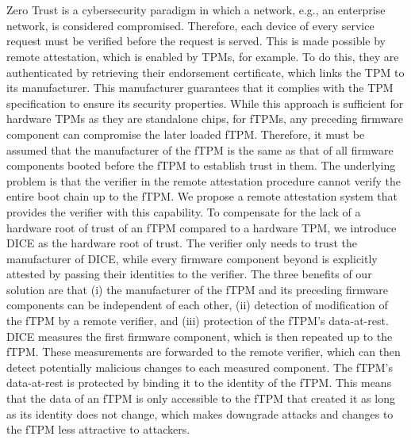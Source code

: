 \chapter{\abstractname}

Zero Trust is a cybersecurity paradigm in which a network, e.g., an enterprise network, is considered compromised.
Therefore, each device of every service request must be verified before the request is served.
This is made possible by remote attestation, which is enabled by \acp{TPM}, for example.
To do this, they are authenticated by retrieving their endorsement certificate, which links the \ac{TPM} to its manufacturer.
This manufacturer guarantees that it complies with the \ac{TPM} specification to ensure its security properties.
While this approach is sufficient for hardware TPMs as they are standalone chips, for \acp{fTPM}, any preceding firmware component can compromise the later loaded \ac{fTPM}.
Therefore, it must be assumed that the manufacturer of the \ac{fTPM} is the same as that of all firmware components booted before the \ac{fTPM} to establish trust in them.
The underlying problem is that the verifier in the remote attestation procedure cannot verify the entire boot chain up to the \ac{fTPM}\@.
We propose a remote attestation system that provides the verifier with this capability.
To compensate for the lack of a hardware root of trust of an \ac{fTPM} compared to a hardware TPM, we introduce \ac{DICE} as the hardware root of trust.
The verifier only needs to trust the manufacturer of \ac{DICE}, while every firmware component beyond is explicitly attested by passing their identities to the verifier.
The three benefits of our solution are that (i) the manufacturer of the \ac{fTPM} and its preceding firmware components can be independent of each other, (ii) detection of modification of the \ac{fTPM} by a remote verifier, and (iii) protection of the \ac{fTPM}'s data-at-rest.
\ac{DICE} measures the first firmware component, which is then repeated up to the \ac{fTPM}\@.
These measurements are forwarded to the remote verifier, which can then detect potentially malicious changes to each measured component.
The \ac{fTPM}'s data-at-rest is protected by binding it to the identity of the \ac{fTPM}\@.
This means that the data of an \ac{fTPM} is only accessible to the \ac{fTPM} that created it as long as its identity does not change, which makes downgrade attacks and changes to the \ac{fTPM} less attractive to attackers.
